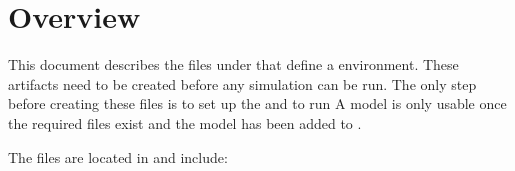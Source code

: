 \documentclass[11pt]{article}
\begin{document}
\label{docstart:environment_profiles}

\section*{Overview}
This document describes the files under  that define a \name{} environment.
These artifacts need to be created before any simulation can be run. 
The only step before creating these files is to set up the  and to run 
A model is only usable once the required files exist and the model has been added to .

\label{sec:allowed-tsenv-models}
The files are located in  and include:
\end{document}
